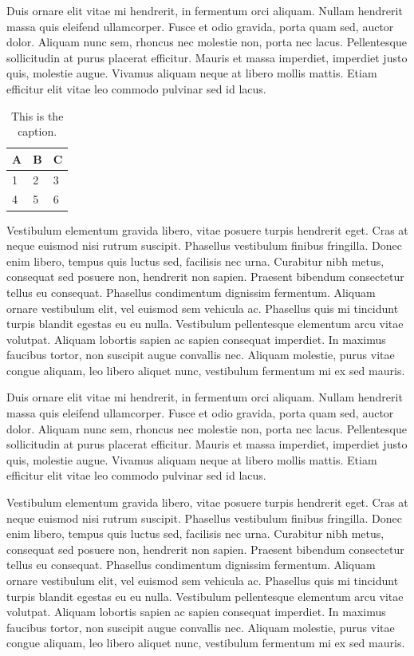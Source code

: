 \documentclass{article}
\begin{document}
        Duis ornare elit vitae mi hendrerit, in fermentum orci aliquam. Nullam hendrerit massa quis eleifend ullamcorper. Fusce et odio gravida, porta quam sed, auctor dolor. Aliquam nunc sem, rhoncus nec molestie non, porta nec lacus. Pellentesque sollicitudin at purus placerat efficitur. Mauris et massa imperdiet, imperdiet justo quis, molestie augue. Vivamus aliquam neque at libero mollis mattis. Etiam efficitur elit vitae leo commodo pulvinar sed id lacus.
    
        \begin{table}[]
            \centering
            \caption{This is the caption.}
            \begin{tabular}{lll}
           \toprule 
           \textbf{A} & \textbf{B} & \textbf{C} \\
           \midrule
                1 & 2 & 3 \\
                4 & 5 & 6 \\
          \bottomrule \end{tabular}
            \label{tab:my_label}
        \end{table}
        
        Vestibulum elementum gravida libero, vitae posuere turpis hendrerit eget. Cras at neque euismod nisi rutrum suscipit. Phasellus vestibulum finibus fringilla. Donec enim libero, tempus quis luctus sed, facilisis nec urna. Curabitur nibh metus, consequat sed posuere non, hendrerit non sapien. Praesent bibendum consectetur tellus eu consequat. Phasellus condimentum dignissim fermentum. Aliquam ornare vestibulum elit, vel euismod sem vehicula ac. Phasellus quis mi tincidunt turpis blandit egestas eu eu nulla. Vestibulum pellentesque elementum arcu vitae volutpat. Aliquam lobortis sapien ac sapien consequat imperdiet. In maximus faucibus tortor, non suscipit augue convallis nec. Aliquam molestie, purus vitae congue aliquam, leo libero aliquet nunc, vestibulum fermentum mi ex sed mauris.

        Duis ornare elit vitae mi hendrerit, in fermentum orci aliquam. Nullam hendrerit massa quis eleifend ullamcorper. Fusce et odio gravida, porta quam sed, auctor dolor. Aliquam nunc sem, rhoncus nec molestie non, porta nec lacus. Pellentesque sollicitudin at purus placerat efficitur. Mauris et massa imperdiet, imperdiet justo quis, molestie augue. Vivamus aliquam neque at libero mollis mattis. Etiam efficitur elit vitae leo commodo pulvinar sed id lacus.
    
        Vestibulum elementum gravida libero, vitae posuere turpis hendrerit eget. Cras at neque euismod nisi rutrum suscipit. Phasellus vestibulum finibus fringilla. Donec enim libero, tempus quis luctus sed, facilisis nec urna. Curabitur nibh metus, consequat sed posuere non, hendrerit non sapien. Praesent bibendum consectetur tellus eu consequat. Phasellus condimentum dignissim fermentum. Aliquam ornare vestibulum elit, vel euismod sem vehicula ac. Phasellus quis mi tincidunt turpis blandit egestas eu eu nulla. Vestibulum pellentesque elementum arcu vitae volutpat. Aliquam lobortis sapien ac sapien consequat imperdiet. In maximus faucibus tortor, non suscipit augue convallis nec. Aliquam molestie, purus vitae congue aliquam, leo libero aliquet nunc, vestibulum fermentum mi ex sed mauris.
    
\end{document}
